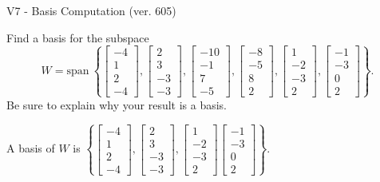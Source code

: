\begin{exercise}
  \begin{exerciseTitle}V7 - Basis Computation (ver. 605)\end{exerciseTitle}
  \begin{exerciseStatement}
    Find a basis for the subspace 
\[W=\mathrm{span}\ \left\{\left[\begin{array}{r}
-4 \\
1 \\
2 \\
-4
\end{array}\right] , \left[\begin{array}{r}
2 \\
3 \\
-3 \\
-3
\end{array}\right] , \left[\begin{array}{r}
-10 \\
-1 \\
7 \\
-5
\end{array}\right] , \left[\begin{array}{r}
-8 \\
-5 \\
8 \\
2
\end{array}\right] , \left[\begin{array}{r}
1 \\
-2 \\
-3 \\
2
\end{array}\right] , \left[\begin{array}{r}
-1 \\
-3 \\
0 \\
2
\end{array}\right]\right\}.\]
 Be sure to explain why your result is a basis.


  \end{exerciseStatement}
  \begin{exerciseAnswer}
   A basis of \(W\) is  \(\left\{\left[\begin{array}{r}
-4 \\
1 \\
2 \\
-4
\end{array}\right] , \left[\begin{array}{r}
2 \\
3 \\
-3 \\
-3
\end{array}\right] , \left[\begin{array}{r}
1 \\
-2 \\
-3 \\
2
\end{array}\right] \left[\begin{array}{r}
-1 \\
-3 \\
0 \\
2
\end{array}\right]\right\}\).
  


  \end{exerciseAnswer}
\end{exercise}